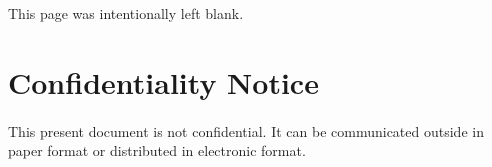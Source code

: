 \documentclass[twoside, 12pt]{article}
\begin{document}
\section*{}
\vfill
\paragraph{}
\begin{center}
    This page was intentionally left blank.
\end{center}
\vfill

\newpage

\section*{Confidentiality Notice}
\vfill
\paragraph{}
This present document is not confidential. It can be communicated outside in paper format
or distributed in electronic format.
\vfill






\newpage
\tableofcontents

\newpage
\listoffigures

\fancyhead[CE]{\leftmark}










\cleardoublepage 
{} 
{}
\printbibliography
\end{document}
